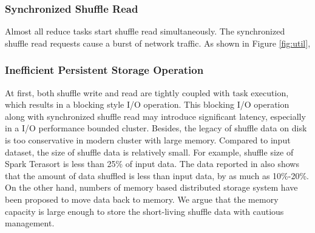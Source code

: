 \subsubsection{Synchronized Shuffle Read}
Almost all reduce tasks start shuffle read simultaneously. 
The synchronized shuffle read requests cause a burst of network traffic. 
As shown in Figure \ref{fig:util}, 

\subsubsection{Inefficient Persistent Storage Operation}
At first, both shuffle write and read are tightly coupled with task execution, which results in a blocking style I/O operation. 
This blocking I/O operation along with synchronized shuffle read may introduce significant latency, especially in a I/O performance bounded cluster.
Besides, the legacy of  shuffle data on disk is too conservative in modern cluster with large memory. 
Compared to input dataset, the size of shuffle data is relatively small. 
For example, shuffle size of Spark Terasort \cite{spark-tera} is less than 25\% of input data. 
The data reported in \cite{makingsense} also shows that the amount of data shuffled is less than input data, by as much as 10\%-20\%. 
On the other hand, numbers of memory based distributed storage system have been proposed \cite{memcached, tachyon, ramcloud} to move data back to memory. 
We argue that the memory capacity is large enough to store the short-living shuffle data with cautious management.

